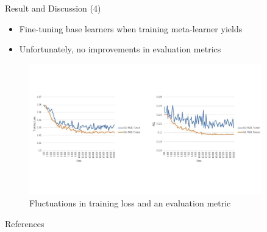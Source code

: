 \documentclass{cubeamer}
\begin{document}
\begin{frame}{Result and Discussion (4)}
    \begin{itemize}
        \item Fine-tuning base learners when training meta-learner yields 
        \item Unfortunately, no improvements in evaluation metrics
    \end{itemize}
    \begin{figure}
        \centering
        \includegraphics[width=0.9\textwidth,trim={0 {4cm} 0 {4cm}},clip]{figures/irp_graph_fluctuation.jpg}
        \caption{Fluctuations in training loss and an evaluation metric}
    \end{figure}
\end{frame}


\begin{frame}{References}
    
    
\end{frame}

\appendix
\end{document}
